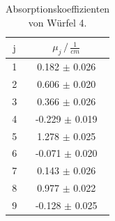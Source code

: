     \begin{table}
      \centering
      \begin{tabular}{c c}
      \toprule
      $\text{j}$ & $\mu_j \,/\, \frac{1}{cm}$ \\
       \midrule 
    1  & 0.182  $\pm$ 0.026\\
    2  & 0.606  $\pm$ 0.020\\
    3  & 0.366  $\pm$  0.026\\
    4  & -0.229 $\pm$ 0.019 \\
    5  & 1.278  $\pm$ 0.025 \\
    6  & -0.071 $\pm$ 0.020 \\
    7  & 0.143  $\pm$ 0.026 \\
    8  & 0.977  $\pm$ 0.022\\
    9  & -0.128 $\pm$  0.025 \\

      \bottomrule
      \end{tabular}
      \caption{Absorptionskoeffizienten von Würfel 4.}
      \label{tab:muj}
      \end{table}